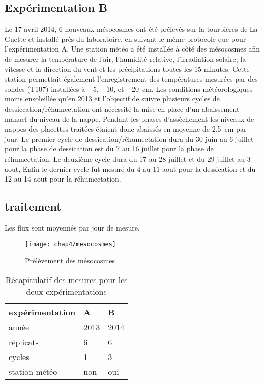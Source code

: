 \subsection{Expérimentation B}
Le 17 avril 2014, 6 nouveaux mésocosmes ont été prélevés sur la tourbières de La Guette et installé près du laboratoire, en suivant le même protocole que pour l'expérimentation A.
Une station météo a été installée à côté des mésocosmes afin de mesurer la température de l'air, l'humidité relative, l'irradiation solaire, la vitesse et la direction du vent et les précipitations toutes les 15 minutes.
Cette station permettait également l'enregistrement des températures mesurées par des sondes (T107) installées à \num{-5}, \num{-10}, et \SI{-20}{\centi\metre}.
Les conditions météorologiques moins ensoleillée qu'en 2013 et l'objectif de suivre plusieurs cycles de dessiccation/réhumectation ont nécessité la mise en place d'un abaissement manuel du niveau de la nappe.
Pendant les phases d'assèchement les niveaux de nappes des placettes traitées étaient donc abaissés en moyenne de \SI{2.5}{\centi\metre} par jour.
Le premier cycle de dessication/réhumectation dura du 30 juin au 6 juillet pour la phase de dessication est du 7 au 16 juillet pour la phase de réhumectation.
Le deuxième cycle dura du 17 au 28 juillet et du 29 juillet au 3 aout, 
Enfin le dernier cycle fut mesuré du 4 au 11 aout pour la dessication et du 12 au 14 aout pour la réhumectation.

\subsection{traitement}
Les flux sont moyennés par jour de mesure.

\begin{figure}
\centering
\texttt{[image: chap4/mesocosmes]}
\caption{Prélèvement des mésocosmes}
\label{fig:mesophoto}
\end{figure}


\begin{table}
\centering
\caption{Récapitulatif des mesures pour les deux expérimentations}
\label{table:recap_hm}
\begin{tabular}{lll}\toprule
expérimentation & A & B \\ \midrule
année & 2013 & 2014 \\
réplicats & 6 & 6 \\
cycles & 1 & 3 \\
station météo & non & oui\\
\bottomrule
\end{tabular}
\end{table}


